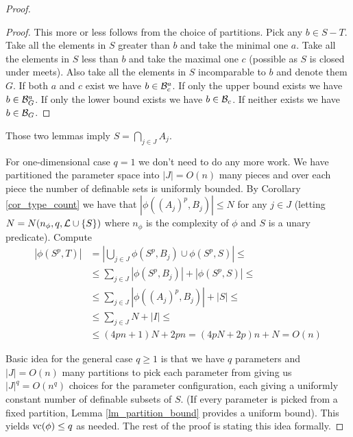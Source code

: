 \begin{proof}
  \begin{proof}
    This more or less follows from the choice of partitions. Pick any $b \in S - T$. Take all the elements in $S$ greater than $b$ and take the minimal one $a$. Take all the elements in $S$ less than $b$ and take the maximal one $c$ (possible as $S$ is closed under meets). Also take all the elements in $S$ incomparable to $b$ and denote them $G$. If both $a$ and $c$ exist we have $b \in \mathcal B^a_c$. If only the upper bound exists we have $b \in \mathcal B^a_G$. If only the lower bound exists we have $b \in \mathcal B_c$. If neither exists we have $b \in \mathcal B_G$.
  \end{proof}
  
  \begin{Note}
    Those two lemmas imply $S = \bigcap_{j \in J} A_j$.
  \end{Note}
  
  \begin{Note}
    For one-dimensional case $q = 1$ we don't need to do any more work. We have partitioned the parameter space into $|J| = O(n)$ many pieces and over each piece the number of definable sets is uniformly bounded. By Corollary \ref{cor_type_count} we have that $|\phi((A_j)^p, B_j)| \leq N$ for any $j \in J$ (letting $N = N(n_\phi, q, \mathcal L \cup \{S\})$ where $n_\phi$ is the complexity of $\phi$ and $S$ is a unary predicate). Compute
    \begin{align*}
      |\phi(S^p, T)|
      &= \left|\bigcup_{j \in J} \phi(S^p, B_j) \cup \phi(S^p, S)\right| \leq \\
      &\leq \sum_{j \in J} |\phi(S^p, B_j)| + |\phi(S^p, S)| \leq \\
      &\leq \sum_{j \in J} |\phi((A_j)^p, B_j)| + |S| \leq \\
      &\leq \sum_{j \in J}N + |I| \leq \\
      &\leq (4pn + 1)N + 2pn = (4pN + 2p)n + N = O(n)
    \end{align*}
  \end{Note}
  Basic idea for the general case $q \geq 1$ is that we have $q$ parameters and $|J| = O(n)$ many partitions to pick each parameter from giving us $|J|^q = O(n^q)$ choices for the parameter configuration, each giving a uniformly constant number of definable subsets of $S$. (If every parameter is picked from a fixed partition, Lemma \ref{lm_partition_bound} provides a uniform bound). This yields $\operatorname{vc}(\phi) \leq q$ as needed. The rest of the proof is stating this idea formally.
  

\end{proof}
